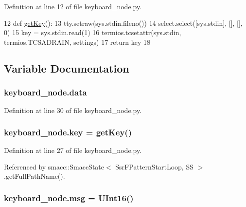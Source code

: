 Definition at line 12 of file keyboard\+\_\+node.\+py.


\begin{DoxyCode}
12 \textcolor{keyword}{def }\hyperlink{namespacekeyboard__node_a14d63e075186fe8cedf60ed3524811f5}{getKey}():
13     tty.setraw(sys.stdin.fileno())
14     select.select([sys.stdin], [], [], 0)
15     key = sys.stdin.read(1)
16     termios.tcsetattr(sys.stdin, termios.TCSADRAIN, settings)
17     \textcolor{keywordflow}{return} key
18 
\end{DoxyCode}


\subsection{Variable Documentation}
\subsubsection[{\texorpdfstring{data}{data}}]{\setlength{\rightskip}{0pt plus 5cm}keyboard\+\_\+node.\+data}\hypertarget{namespacekeyboard__node_a33f8346a3ffb7a9fef12da96e958f14e}{}\label{namespacekeyboard__node_a33f8346a3ffb7a9fef12da96e958f14e}


Definition at line 30 of file keyboard\+\_\+node.\+py.

\subsubsection[{\texorpdfstring{key}{key}}]{\setlength{\rightskip}{0pt plus 5cm}keyboard\+\_\+node.\+key = {\bf get\+Key}()}\hypertarget{namespacekeyboard__node_aec12217d2be0bbc768f52b63b0673925}{}\label{namespacekeyboard__node_aec12217d2be0bbc768f52b63b0673925}


Definition at line 27 of file keyboard\+\_\+node.\+py.



Referenced by smacc\+::\+Smacc\+State$<$ Ssr\+F\+Pattern\+Start\+Loop, S\+S $>$.\+get\+Full\+Path\+Name().

\subsubsection[{\texorpdfstring{msg}{msg}}]{\setlength{\rightskip}{0pt plus 5cm}keyboard\+\_\+node.\+msg = U\+Int16()}\hypertarget{namespacekeyboard__node_a768777e12f75b89e4a0a60acf748e9eb}{}\label{namespacekeyboard__node_a768777e12f75b89e4a0a60acf748e9eb}


